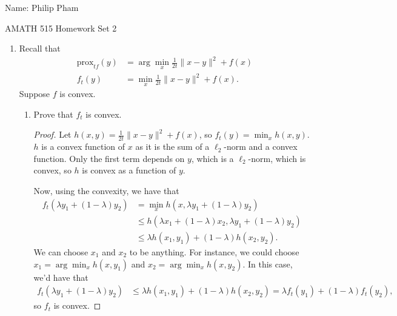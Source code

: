 \documentclass[11pt]{amsart}
\begin{document}
{\Large Name: Philip Pham}  \\
\begin{center}
\Large AMATH 515 \hskip 2in Homework Set 2\\
\end{center}
\vskip 32pt

\begin{enumerate}



\item Recall that 
\[
\begin{aligned}
\mbox{prox}_{t f}(y) &= \arg\min_{x} \frac{1}{2t}\|x-y\|^2 + f(x)\\
f_t(y) &= \min_x \frac{1}{2t}\|x-y\|^2 + f(x).
\end{aligned}
\] 
Suppose $f$ is convex. 
\vskip 16pt
\begin{enumerate}

\item Prove that $f_t$ is convex.
  \begin{proof}
    Let $h(x, y) = \frac{1}{2t}\|x-y\|^2 + f(x)$, so $f_t(y) = \min_x h(x,
    y)$. $h$ is a convex function of $x$ as it is the sum of a $\ell_2$-norm and
    a convex function. Only the first term depends on $y$, which is a
    $\ell_2$-norm, which is convex, so $h$ is convex as a function of $y$.

    Now, using the convexity, we have that
    \begin{align*}
      f_t\left(\lambda y_1 + (1-\lambda)y_2\right)
      &= \min_x h\left(x, \lambda y_1 + (1-\lambda)y_2\right) \\
      &\leq h\left(\lambda x_1 + (1-\lambda)x_2, \lambda y_1 + (1-\lambda)y_2\right) \\
      &\leq \lambda h\left(x_1, y_1\right) + (1-\lambda)h\left(x_2, y_2\right).
    \end{align*}
    We can choose $x_1$ and $x_2$ to be anything. For instance, we could choose
    $x_1 = \arg\min_{x} h\left(x, y_1\right)$ and
    $x_2 = \arg\min_{x} h\left(x, y_2\right)$. In this case, we'd have that
    \begin{align*}
      f_t\left(\lambda y_1 + (1-\lambda)y_2\right)
      &\leq \lambda h\left(x_1, y_1\right) + (1-\lambda)h\left(x_2, y_2\right)
        = \lambda f_t\left(y_1\right) + \left(1 - \lambda\right) f_t\left(y_2\right),
    \end{align*}
    so $f_t$ is convex.
  \end{proof}
  

\end{enumerate}
\end{enumerate}
\end{document}
